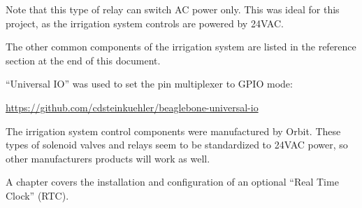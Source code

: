 Note that this type of relay can switch AC power only.  This was ideal for this 
project, as the irrigation system controls are powered by 24VAC.

The other common components of the irrigation system are listed in the 
reference section at the end of this document.

``Universal IO'' was used to set the pin multiplexer to GPIO mode:

\url{https://github.com/cdsteinkuehler/beaglebone-universal-io}

The irrigation system control components were manufactured by Orbit.  These 
types of solenoid valves and relays seem to be standardized to 24VAC power, so 
other manufacturers products will work as well.

A chapter covers the installation and configuration of an optional ``Real Time Clock'' (RTC).




